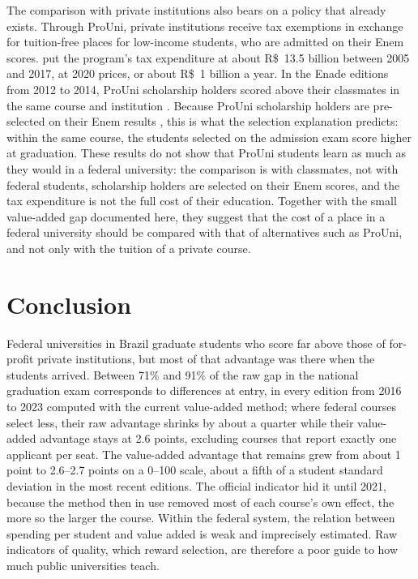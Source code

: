 \documentclass[11pt,a4paper]{article}
\begin{document}
The comparison with private institutions also bears on a policy that already exists. Through ProUni, private institutions receive tax exemptions in exchange for tuition-free places for low-income students, who are admitted on their Enem scores. \citet{almeida2022} put the program's tax expenditure at about R\$~13.5 billion between 2005 and 2017, at 2020 prices, or about R\$~1 billion a year. In the Enade editions from 2012 to 2014, ProUni scholarship holders scored above their classmates in the same course and institution \citep{wainer2018}. Because ProUni scholarship holders are pre-selected on their Enem results \citep[art.~3]{lei11096}, this is what the selection explanation predicts: within the same course, the students selected on the admission exam score higher at graduation. These results do not show that ProUni students learn as much as they would in a federal university: the comparison is with classmates, not with federal students, scholarship holders are selected on their Enem scores, and the tax expenditure is not the full cost of their education. Together with the small value-added gap documented here, they suggest that the cost of a place in a federal university should be compared with that of alternatives such as ProUni, and not only with the tuition of a private course.

\section{Conclusion}\label{sec:conclusion}

Federal universities in Brazil graduate students who score far above those of for-profit private institutions, but most of that advantage was there when the students arrived. Between 71\% and 91\% of the raw gap in the national graduation exam corresponds to differences at entry, in every edition from 2016 to 2023 computed with the current value-added method; where federal courses select less, their raw advantage shrinks by about a quarter while their value-added advantage stays at 2.6 points, excluding courses that report exactly one applicant per seat. The value-added advantage that remains grew from about 1 point to 2.6--2.7 points on a 0--100 scale, about a fifth of a student standard deviation in the most recent editions. The official indicator hid it until 2021, because the method then in use removed most of each course's own effect, the more so the larger the course. Within the federal system, the relation between spending per student and value added is weak and imprecisely estimated. Raw indicators of quality, which reward selection, are therefore a poor guide to how much public universities teach.
\end{document}
